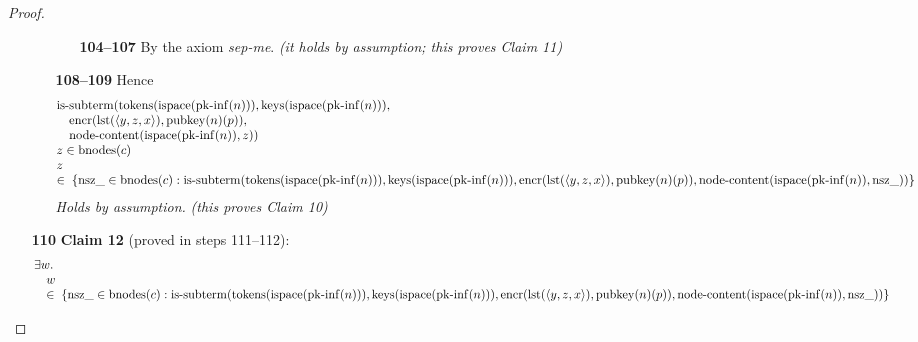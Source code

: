 \documentclass[11pt]{article}
\theoremstyle{plain}
\begin{document}
\begin{proof}
\begin{itemize}[leftmargin=2.8em, itemsep=4pt, parsep=1pt]
\begin{itemize}[leftmargin=2.8em, itemsep=4pt, parsep=1pt]
  \begin{itemize}[leftmargin=2.8em, itemsep=4pt, parsep=1pt]
  \item[\textbf{104--107}] By the axiom \emph{sep-me}.  \emph{(it holds by assumption; this proves Claim 11)}
  \end{itemize}
  \item[\textbf{108--109}] Hence 
\begin{equation*}
\begin{array}{@{}l@{}}
\begin{array}{@{}l@{}} \operatorname{is\text{-}subterm}(\operatorname{tokens}(\operatorname{ispace}(\operatorname{pk\text{-}inf}(n))), \operatorname{keys}(\operatorname{ispace}(\operatorname{pk\text{-}inf}(n))), \\ \quad \operatorname{encr}(\operatorname{lst}(\langle y, z, x \rangle), \operatorname{pubkey}(n)(p)), \\ \quad \operatorname{node\text{-}content}(\operatorname{ispace}(\operatorname{pk\text{-}inf}(n)), z)) \end{array} \\
z \in \operatorname{bnodes}(c) \\
\begin{array}{@{}l@{}} z \\ \in\; \{\operatorname{nsz\_} \in \operatorname{bnodes}(c) : \operatorname{is\text{-}subterm}(\operatorname{tokens}(\operatorname{ispace}(\operatorname{pk\text{-}inf}(n))), \operatorname{keys}(\operatorname{ispace}(\operatorname{pk\text{-}inf}(n))), \operatorname{encr}(\operatorname{lst}(\langle y, z, x \rangle), \operatorname{pubkey}(n)(p)), \operatorname{node\text{-}content}(\operatorname{ispace}(\operatorname{pk\text{-}inf}(n)), \operatorname{nsz\_}))\} \end{array}
\end{array}
\end{equation*}
\emph{Holds by assumption.}  \emph{(this proves Claim 10)}
  \end{itemize}
  \item[\textbf{110}] \textbf{Claim 12} (proved in steps 111--112):
\begin{equation*}
\begin{array}{@{}l@{}} \exists w. \\ \quad w \\ \quad \in\; \{\operatorname{nsz\_} \in \operatorname{bnodes}(c) : \operatorname{is\text{-}subterm}(\operatorname{tokens}(\operatorname{ispace}(\operatorname{pk\text{-}inf}(n))), \operatorname{keys}(\operatorname{ispace}(\operatorname{pk\text{-}inf}(n))), \operatorname{encr}(\operatorname{lst}(\langle y, z, x \rangle), \operatorname{pubkey}(n)(p)), \operatorname{node\text{-}content}(\operatorname{ispace}(\operatorname{pk\text{-}inf}(n)), \operatorname{nsz\_}))\} \end{array}
\end{equation*}


\end{itemize}
\end{proof}
\end{document}
